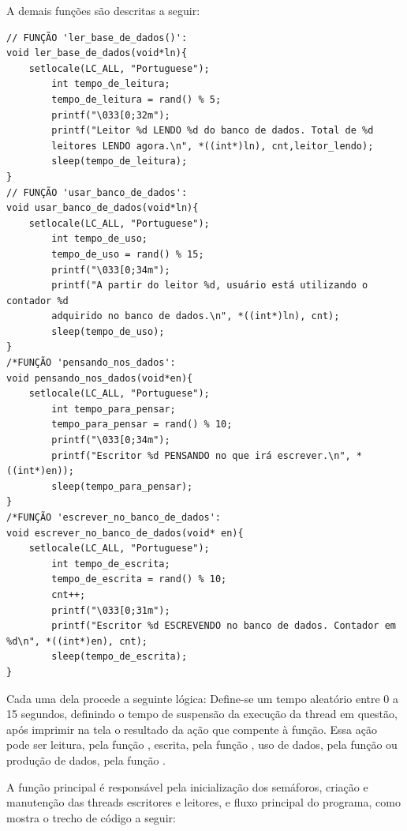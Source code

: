 \documentclass[
	12pt,				%
	openright,			%
	oneside,			%
	a4paper,			%
	chapter=TITLE,		%
	english,			%
	french,				%
	spanish,			%
	brazil				%
	]{abntex2}
\theoremstyle{definition}
\begin{document}
A demais funções são descritas a seguir:

\begin{verbatim}
// FUNÇÃO 'ler_base_de_dados()':
void ler_base_de_dados(void*ln){
    setlocale(LC_ALL, "Portuguese");
        int tempo_de_leitura;
        tempo_de_leitura = rand() % 5;
        printf("\033[0;32m");
        printf("Leitor %d LENDO %d do banco de dados. Total de %d 
        leitores LENDO agora.\n", *((int*)ln), cnt,leitor_lendo);
        sleep(tempo_de_leitura);
}
// FUNÇÃO 'usar_banco_de_dados':
void usar_banco_de_dados(void*ln){
    setlocale(LC_ALL, "Portuguese");
        int tempo_de_uso;
        tempo_de_uso = rand() % 15;
        printf("\033[0;34m");
        printf("A partir do leitor %d, usuário está utilizando o contador %d 
        adquirido no banco de dados.\n", *((int*)ln), cnt);
        sleep(tempo_de_uso);
}
/*FUNÇÃO 'pensando_nos_dados':
void pensando_nos_dados(void*en){
    setlocale(LC_ALL, "Portuguese");
        int tempo_para_pensar;
        tempo_para_pensar = rand() % 10;
        printf("\033[0;34m");
        printf("Escritor %d PENSANDO no que irá escrever.\n", *((int*)en));
        sleep(tempo_para_pensar);
}
/*FUNÇÃO 'escrever_no_banco_de_dados':
void escrever_no_banco_de_dados(void* en){
    setlocale(LC_ALL, "Portuguese");
        int tempo_de_escrita;
        tempo_de_escrita = rand() % 10;
        cnt++;
        printf("\033[0;31m");
        printf("Escritor %d ESCREVENDO no banco de dados. Contador em %d\n", *((int*)en), cnt);
        sleep(tempo_de_escrita);
}
\end{verbatim}

Cada uma dela procede a seguinte lógica: Define-se um tempo aleatório entre 0 a 15 segundos, definindo o tempo de suspensão da execução da thread em questão, após imprimir na tela o resultado da ação que compente à função. Essa ação pode ser leitura, pela função , escrita, pela função , uso de dados, pela função  ou produção de dados, pela função .

A função principal  é responsável pela inicialização dos semáforos, criação e manutenção das threads escritores e leitores, e fluxo principal do programa, como mostra o trecho de código a seguir:
\end{document}

